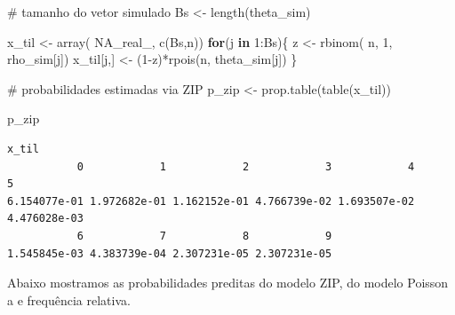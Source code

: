 \documentclass[
  letterpaper,
  DIV=11,
  numbers=noendperiod]{scrreprt}
\newenvironment{Shaded}{\begin{snugshade}}{\end{snugshade}}
\newcommand{\CommentTok}[1]{\textcolor[rgb]{0.37,0.37,0.37}{#1}}
\newcommand{\ConstantTok}[1]{\textcolor[rgb]{0.56,0.35,0.01}{#1}}
\newcommand{\ControlFlowTok}[1]{\textcolor[rgb]{0.00,0.23,0.31}{\textbf{#1}}}
\newcommand{\DecValTok}[1]{\textcolor[rgb]{0.68,0.00,0.00}{#1}}
\newcommand{\FunctionTok}[1]{\textcolor[rgb]{0.28,0.35,0.67}{#1}}
\newcommand{\NormalTok}[1]{\textcolor[rgb]{0.00,0.23,0.31}{#1}}
\newcommand{\OtherTok}[1]{\textcolor[rgb]{0.00,0.23,0.31}{#1}}
\newcommand{\SpecialCharTok}[1]{\textcolor[rgb]{0.37,0.37,0.37}{#1}}
\theoremstyle{plain}
\theoremstyle{definition}
\theoremstyle{definition}
\theoremstyle{remark}
\begin{document}
\begin{Shaded}
\begin{Highlighting}[]
\CommentTok{\# tamanho do vetor simulado}
\NormalTok{Bs }\OtherTok{\textless{}{-}} \FunctionTok{length}\NormalTok{(theta\_sim)}

\NormalTok{x\_til }\OtherTok{\textless{}{-}} \FunctionTok{array}\NormalTok{( }\ConstantTok{NA\_real\_}\NormalTok{, }\FunctionTok{c}\NormalTok{(Bs,n))}
\ControlFlowTok{for}\NormalTok{(j }\ControlFlowTok{in} \DecValTok{1}\SpecialCharTok{:}\NormalTok{Bs)\{}
\NormalTok{  z }\OtherTok{\textless{}{-}} \FunctionTok{rbinom}\NormalTok{( n, }\DecValTok{1}\NormalTok{, rho\_sim[j])}
\NormalTok{  x\_til[j,] }\OtherTok{\textless{}{-}}\NormalTok{ (}\DecValTok{1}\SpecialCharTok{{-}}\NormalTok{z)}\SpecialCharTok{*}\FunctionTok{rpois}\NormalTok{(n, theta\_sim[j])}
\NormalTok{\}}

\CommentTok{\# probabilidades estimadas via ZIP}
\NormalTok{p\_zip }\OtherTok{\textless{}{-}} \FunctionTok{prop.table}\NormalTok{(}\FunctionTok{table}\NormalTok{(x\_til))}

\NormalTok{p\_zip}
\end{Highlighting}
\end{Shaded}

\begin{verbatim}
x_til
           0            1            2            3            4            5 
6.154077e-01 1.972682e-01 1.162152e-01 4.766739e-02 1.693507e-02 4.476028e-03 
           6            7            8            9 
1.545845e-03 4.383739e-04 2.307231e-05 2.307231e-05 
\end{verbatim}

Abaixo mostramos as probabilidades preditas do modelo ZIP, do modelo
Poisson a e frequência relativa.
\end{document}
